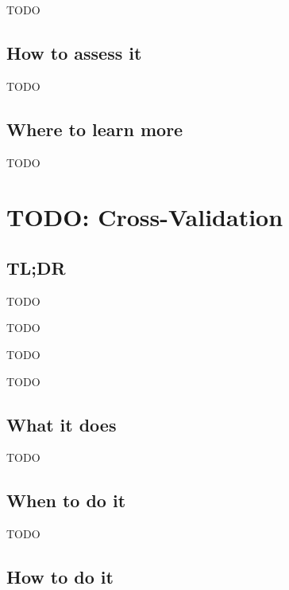 \documentclass[
]{book}
\providecommand{\tightlist}{%
  \setlength{\itemsep}{0pt}\setlength{\parskip}{0pt}}
\begin{document}
TODO

\hypertarget{how-to-assess-it-8}{%
\section{How to assess it}\label{how-to-assess-it-8}}

TODO

\hypertarget{where-to-learn-more-8}{%
\section{Where to learn more}\label{where-to-learn-more-8}}

TODO

\hypertarget{cross-validation}{%
\chapter{TODO: Cross-Validation}\label{cross-validation}}

\hypertarget{tldr-9}{%
\section{TL;DR}\label{tldr-9}}

\begin{description}
\tightlist
\item[What it does]
TODO
\item[When to do it]
TODO
\item[How to do it]
TODO
\item[How to assess it]
TODO
\end{description}

\hypertarget{what-it-does-9}{%
\section{What it does}\label{what-it-does-9}}

TODO

\hypertarget{when-to-do-it-9}{%
\section{When to do it}\label{when-to-do-it-9}}

TODO

\hypertarget{how-to-do-it-9}{%
\section{How to do it}\label{how-to-do-it-9}}
\end{document}

